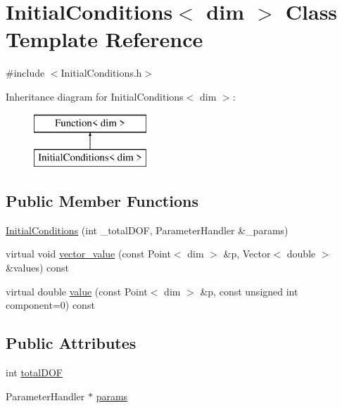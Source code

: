 \section{Initial\+Conditions$<$ dim $>$ Class Template Reference}
\label{class_initial_conditions}


{\ttfamily \#include $<$Initial\+Conditions.\+h$>$}

Inheritance diagram for Initial\+Conditions$<$ dim $>$\+:\begin{figure}[H]
\begin{center}
\leavevmode
\includegraphics[height=2.000000cm]{class_initial_conditions}
\end{center}
\end{figure}
\subsection*{Public Member Functions}
\begin{DoxyCompactItemize}
\item 
\mbox{\hyperlink{class_initial_conditions_a86f1233a3d8103059d1a499e1e1d9c04}{Initial\+Conditions}} (int \+\_\+total\+D\+OF, Parameter\+Handler \&\+\_\+params)
\item 
virtual void \mbox{\hyperlink{class_initial_conditions_aa10cfdd7350c3810a8deab707f397657}{vector\+\_\+value}} (const Point$<$ dim $>$ \&p, Vector$<$ double $>$ \&values) const
\item 
virtual double \mbox{\hyperlink{class_initial_conditions_a369cea7ba74f8cd0a6ca12e0c164ff74}{value}} (const Point$<$ dim $>$ \&p, const unsigned int component=0) const
\end{DoxyCompactItemize}
\subsection*{Public Attributes}
\begin{DoxyCompactItemize}
\item 
int \mbox{\hyperlink{class_initial_conditions_acf5f14c806d215a0bf5c9f46d3e23607}{total\+D\+OF}}
\item 
Parameter\+Handler $\ast$ \mbox{\hyperlink{class_initial_conditions_a31d5e7a5228d9d55ba00fae854fcfaa0}{params}}
\end{DoxyCompactItemize}


